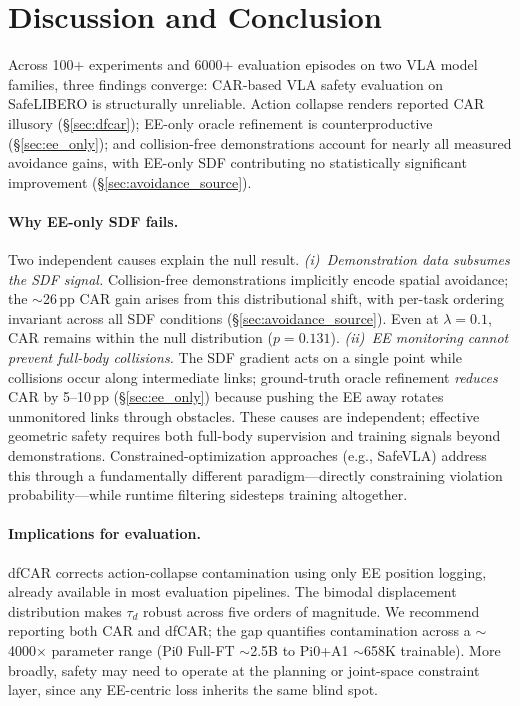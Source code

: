 \section{Discussion and Conclusion}\label{sec:conclusion}

Across 100+ experiments and 6000+ evaluation episodes on two VLA model families, three findings converge: CAR-based VLA safety evaluation on SafeLIBERO is structurally unreliable. Action collapse renders reported CAR illusory (\S\ref{sec:dfcar}); EE-only oracle refinement is counterproductive (\S\ref{sec:ee_only}); and collision-free demonstrations account for nearly all measured avoidance gains, with EE-only SDF contributing no statistically significant improvement (\S\ref{sec:avoidance_source}).

\paragraph{Why EE-only SDF fails.}
Two independent causes explain the null result. \textit{(i)~Demonstration data subsumes the SDF signal.} Collision-free demonstrations implicitly encode spatial avoidance; the ${\sim}$26\,pp CAR gain arises from this distributional shift, with per-task ordering invariant across all SDF conditions (\S\ref{sec:avoidance_source}). Even at $\lambda = 0.1$, CAR remains within the null distribution ($p = 0.131$). \textit{(ii)~EE monitoring cannot prevent full-body collisions.} The SDF gradient acts on a single point while collisions occur along intermediate links; ground-truth oracle refinement \emph{reduces} CAR by 5--10\,pp (\S\ref{sec:ee_only}) because pushing the EE away rotates unmonitored links through obstacles. These causes are independent; effective geometric safety requires both full-body supervision and training signals beyond demonstrations. Constrained-optimization approaches (e.g., SafeVLA) address this through a fundamentally different paradigm---directly constraining violation probability---while runtime filtering sidesteps training altogether.

\paragraph{Implications for evaluation.}
dfCAR corrects action-collapse contamination using only EE position logging, already available in most evaluation pipelines. The bimodal displacement distribution makes $\tau_d$ robust across five orders of magnitude. We recommend reporting both CAR and dfCAR; the gap quantifies contamination across a ${\sim}$4000$\times$ parameter range (Pi0 Full-FT ${\sim}$2.5B to Pi0+A1 ${\sim}$658K trainable). More broadly, safety may need to operate at the planning or joint-space constraint layer, since any EE-centric loss inherits the same blind spot.

